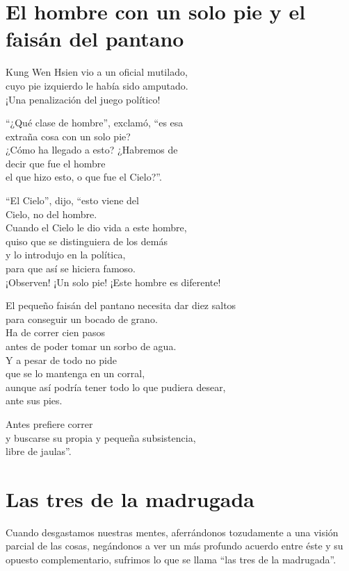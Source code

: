 \documentclass[book,b5paper,hidelinks,final]{memoir}
\begin{document}
	\chapter*{El hombre con un solo pie y el faisán del pantano}
	
	Kung Wen Hsien vio a un oficial mutilado,\\
	cuyo pie izquierdo le había sido amputado.\\
	¡Una penalización del juego político!
	
	``¿Qué clase de hombre'', exclamó, ``es esa\\
	extraña cosa con un solo pie?\\
	¿Cómo ha llegado a esto? ¿Habremos de\\
	decir que fue el hombre\\
	el que hizo esto, o que fue el Cielo?''.
	
	``El Cielo'', dijo, ``esto viene del\\
	Cielo, no del hombre.\\
	Cuando el Cielo le dio vida a este hombre,\\
	quiso que se distinguiera de los demás\\
	y lo introdujo en la política,\\
	para que así se hiciera famoso.\\
	¡Observen! ¡Un solo pie! ¡Este hombre es diferente!
	
	El pequeño faisán del pantano necesita dar diez saltos\\
	para conseguir un bocado de grano.\\
	Ha de correr cien pasos\\
	antes de poder tomar un sorbo de agua.\\
	Y a pesar de todo no pide\\
	que se lo mantenga en un corral,\\
	aunque así podría tener todo lo que pudiera desear,\\
	ante sus pies.
	
	Antes prefiere correr\\
	y buscarse su propia y pequeña subsistencia,\\
	libre de jaulas''.
	
	\chapter*{Las tres de la madrugada}
	
	Cuando desgastamos nuestras mentes, aferrándonos tozudamente a una
	visión parcial de las cosas, negándonos a ver un más profundo acuerdo
	entre éste y su opuesto complementario, sufrimos lo que se llama ``las
	tres de la madrugada''.
	
\end{document}
